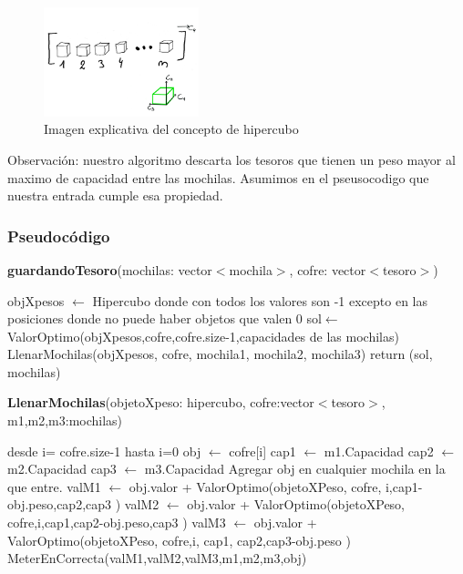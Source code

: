 \documentclass[spanish,12pt]{article}
\begin{document}
\begin{figure}[H]
\centering
\includegraphics[width=0.4\textwidth]{hipercubo}
\caption{Imagen explicativa del concepto de hipercubo}
\end{figure}


Observación: nuestro algoritmo descarta los tesoros que tienen un peso mayor al maximo de capacidad entre las mochilas. Asumimos en el pseusocodigo que nuestra entrada cumple esa propiedad.


\subsubsection{Pseudocódigo}

\begin{algorithm}[H]{\textbf{guardandoTesoro}(mochilas: vector$<$mochila$>$, cofre: vector$<$tesoro$>$)}
	\begin{algorithmic}[1]
		\State objXpesos $\gets$ Hipercubo donde con todos los valores son -1 excepto en las posiciones donde no puede haber objetos que valen  0 %
		\State sol$\gets$ ValorOptimo(objXpesos,cofre,cofre.size-1,capacidades de las mochilas)
		\State LlenarMochilas(objXpesos, cofre, mochila1, mochila2, mochila3)
		\State return (sol, mochilas)
	\end{algorithmic}
\end{algorithm}



\begin{algorithm}[H]{\textbf{LlenarMochilas}(objetoXpeso: hipercubo, cofre:vector$<$tesoro$>$, m1,m2,m3:mochilas)}
	\begin{algorithmic}[1]
		\State desde i= cofre.size-1 hasta i=0
			\State obj $\gets$ cofre[i]
			\State cap1 $\gets$ m1.Capacidad
			\State cap2 $\gets$ m2.Capacidad
			\State cap3 $\gets$ m3.Capacidad
			\If{$i=0$}
				\State Agregar obj en cualquier mochila en la que entre.
			\Else
				\State valM1 $\gets$ obj.valor + ValorOptimo(objetoXPeso, cofre, i,cap1-obj.peso,cap2,cap3 )
				\State valM2 $\gets$ obj.valor + ValorOptimo(objetoXPeso, cofre,i,cap1,cap2-obj.peso,cap3 )
				\State valM3 $\gets$ obj.valor + ValorOptimo(objetoXPeso, cofre,i, cap1, cap2,cap3-obj.peso )
				\State MeterEnCorrecta(valM1,valM2,valM3,m1,m2,m3,obj)
			\EndIf

	\end{algorithmic}
\end{algorithm}
\end{document}
